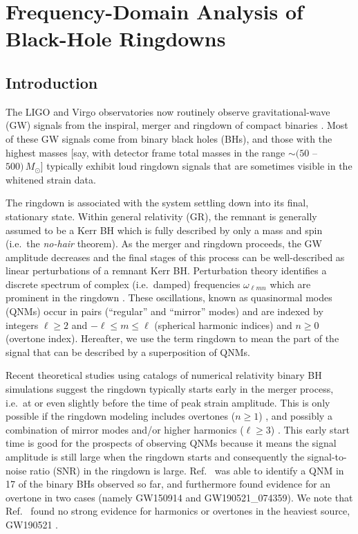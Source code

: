 
\chapter{Frequency-Domain Analysis of Black-Hole Ringdowns}

\label{Chapter3}

\section{Introduction}\label{ch3:sec:introduction}

The LIGO \cite{LIGOScientific:2014pky} and Virgo \cite{VIRGO:2014yos} observatories now routinely observe gravitational-wave (GW) signals from the inspiral, merger and ringdown of compact binaries \cite{LIGOScientific:2018mvr, LIGOScientific:2020ibl}.
Most of these GW signals come from binary black holes (BHs), and those with the highest masses [say, with detector frame total masses in the range $\sim (50$ -- $500)\,M_\odot$] typically exhibit loud ringdown signals that are sometimes visible in the whitened strain data.

The ringdown is associated with the system settling down into its final, stationary state.
Within general relativity (GR), the remnant is generally assumed to be a Kerr BH which is fully described by only a mass and spin (i.e.\ the \emph{no-hair} theorem).
As the merger and ringdown proceeds, the GW amplitude decreases and the final stages of this process can be well-described as linear perturbations of a remnant Kerr BH.
Perturbation theory identifies a discrete spectrum of complex (i.e.\ damped) frequencies $\omega_{\ell m n}$ which are prominent in the ringdown \cite{Berti:2009kk}.
These oscillations, known as quasinormal modes (QNMs) occur in pairs (``regular'' and ``mirror'' modes) and are indexed by integers $\ell \geq 2$ and $-\ell \leq m \leq \ell$ (spherical harmonic indices) and $n \geq 0$ (overtone index).
Hereafter, we use the term ringdown to mean the part of the signal that can be described by a superposition of QNMs.

Recent theoretical studies using catalogs of numerical relativity binary BH simulations suggest the ringdown typically starts early in the merger process, i.e.\ at or even slightly before the time of peak strain amplitude. 
This is only possible if the ringdown modeling includes overtones ($n \geq 1$) \cite{Giesler:2019uxc, JimenezForteza:2020cve, Forteza:2021wfq}, and possibly a combination of mirror modes and/or higher harmonics ($\ell\geq 3$) \cite{Cook:2020otn, Dhani:2020nik, Finch:2021iip}.
This early start time is good for the prospects of observing QNMs because it means the signal amplitude is still large when the ringdown starts and consequently the signal-to-noise ratio (SNR) in the ringdown is large.
Ref.~\cite{LIGOScientific:2020tif} was able to identify a QNM in 17 of the binary BHs observed so far, and furthermore found evidence for an overtone in two cases (namely GW150914 \cite{LIGOScientific:2016aoc} and GW190521\_074359).
We note that Ref.~\cite{LIGOScientific:2020tif} found no strong evidence for harmonics or overtones in the heaviest source, GW190521 \cite{LIGOScientific:2020iuh}.

